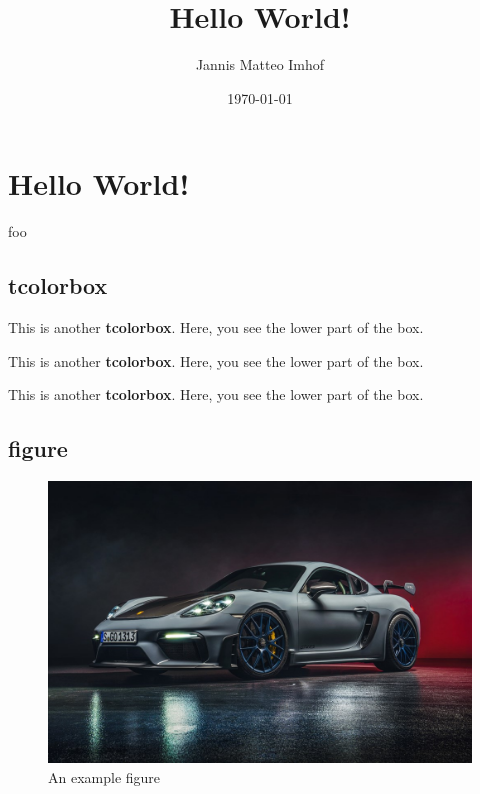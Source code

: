 \documentclass{scrreprt}
\title{Hello World!}
\date{\today}
\author{Jannis Matteo Imhof}
\begin{document}
\maketitle

\tableofcontents

\chapter{Hello World!}
\Gls{foo}

\section{tcolorbox}
\begin{tcolorbox}[colback=red!5!white,colframe=red!75!black,title=My nice heading]
    This is another \textbf{tcolorbox}.
    \tcblower
    Here, you see the lower part of the box.
\end{tcolorbox}

\begin{tcolorbox}[colback=black!25!white,colframe=black!75!white,title=My nice heading]
    This is another \textbf{tcolorbox}.
    \tcblower
    Here, you see the lower part of the box.
\end{tcolorbox}

\begin{tcolorbox}
    This is another \textbf{tcolorbox}.
    \tcblower
    Here, you see the lower part of the box.
\end{tcolorbox}

\section{figure}
\begin{figure}[!h]
    \centering
    \includegraphics[width=\linewidth]{porsche_911_gt4_rs.jpg}
    \caption{An example figure}
    \label{fgr:porsche}
\end{figure}
\end{document}
